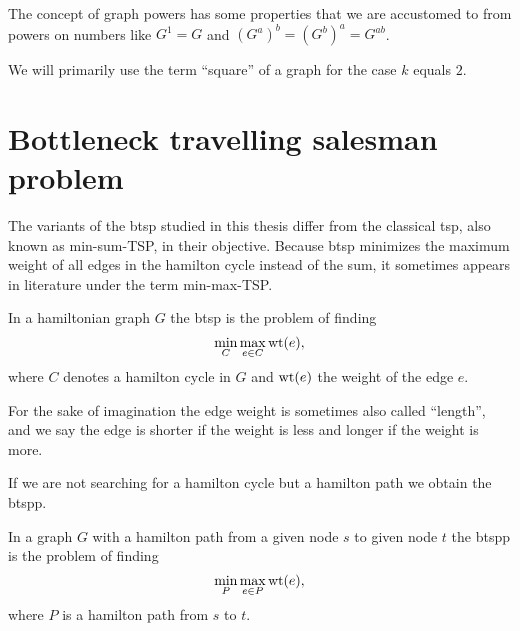 The concept of graph powers has some properties that we are accustomed to from powers on numbers like \(G^1 = G\) and \({(G^a)}^b = {(G^b)}^a = G^{ab}\).

We will primarily use the term \enquote{square} of a graph for the case \(k\) equals \(2\).


\section{Bottleneck travelling salesman problem}
The variants of the \gls{btsp} studied in this thesis differ from the classical \gls{tsp}, also known as min-sum-TSP, in their objective. Because \gls{btsp} minimizes the maximum weight of all edges in the hamilton cycle instead of the sum, it sometimes appears in literature under the term min-max-TSP.

\begin{definition}\label{def:btsp}
  In a hamiltonian graph \(G\) the \gls{btsp} is the problem of finding
  \begin{equation*}
    \min\limits_{C} \max\limits_{e \in C} \textrm{wt}(e),
  \end{equation*}
  where \(C\) denotes a hamilton cycle in \(G\) and \(\textrm{wt}(e)\) the weight of the edge \(e\).
\end{definition}

For the sake of imagination the edge weight is sometimes also called \enquote{length}, and we say the edge is shorter if the weight is less and longer if the weight is more.

If we are not searching for a hamilton cycle but a hamilton path we obtain the \gls{btspp}.

\begin{definition}\label{def:btspp}
  In a graph \(G\) with a hamilton path from a given node \(s\) to given node \(t\) the \gls{btspp} is the problem of finding
  \begin{equation*}
    \min\limits_{P} \max\limits_{e \in P} \textrm{wt}(e),
  \end{equation*}
  where \(P\) is a hamilton path from \(s\) to \(t\).
\end{definition}
